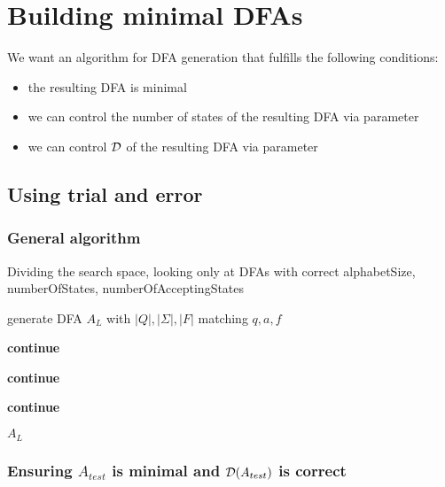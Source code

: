 
\chapter{Building minimal DFAs}

We want an algorithm for DFA generation that fulfills the following conditions:
\begin{itemize}
	\item the resulting DFA is minimal
	\item we can control the number of states of the resulting DFA via parameter
	\item we can control $\mathcal{D}$ of the resulting DFA via parameter
\end{itemize}

\section{Using trial and error}

\subsection{General algorithm}

Dividing the search space, looking only at DFAs with correct alphabetSize, numberOfStates, numberOfAcceptingStates

\vspace{0.2cm}
\begin{algorithmic}[1]
			\State generate DFA $A_L$ with $|Q|, |\Sigma|, |F|$ matching $q, a, f$
			
				\State \textbf{continue}
			\EndIf
			
				\State \textbf{continue}
			\EndIf
			
				\State \textbf{continue}
			\EndIf
			
			\State\Return $A_L$
		\EndWhile
	\EndFunction
\end{algorithmic}
\vspace{0.2cm}

\subsection{Ensuring $A_{test}$ is minimal and $\mathcal{D}(A_{test})$ is correct}

